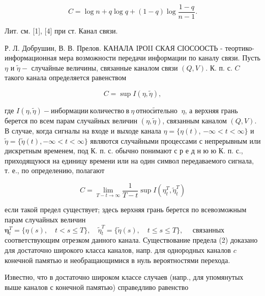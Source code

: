 \documentclass[10pt]{article}
\begin{document}
\[

C=\log n+q \log q+(1-q) \log \frac{1-q}{n-1} .

\]



Лит. см. [1], [4] при ст. Канал связи.



Р. Л. Добрушин, В. В. Прелов. КАНАЛА IРОII СКАЯ СІОСООСТЬ - теортико-информационная мера возможности передачи информации по каналу связи. Пусть $\eta$ и $\tilde{\eta}-$ случайные величины, связанные каналом связи $(Q, V)$. К. п. с. $C$ такого канала определяется равенством



\[

C=\sup I(\eta, \tilde{\eta}),

\]



где $I(\eta, \tilde{\eta})-и н б о р м а ц и и ~ к о л и ч е с т в о ~ в ~ \tilde{\eta ~ о т н о с и т е л ь н о ~}$ $\eta$, а верхняя грань берется по всем парам случайных величин $(\eta, \tilde{\eta})$, связанным каналом $(Q, V)$. В случае, когда сигналы на входе и выходе канала $\eta=\{\eta(t)$, $-\infty<t<\infty\}$ и $\tilde{\eta}=\{\tilde{\eta}(t),-\infty<t<\infty\}$ являются случайными процессами с непрерывным или дискретным временем, под К. п. с. обычно понимают с р е д н ю ю К. п. с., приходящуюся на единицу времени или на один символ передаваемого сигнала, т. е., по определению, полагают



\[

C=\lim _{T-t \rightarrow \infty} \frac{1}{T-t} \sup I\left(\eta_{t}^{T}, \tilde{\eta}_{t}^{T}\right)

\]



если такой предел существует; здесь верхняя грань берется по всевозможным парам случайных величин $\boldsymbol{\eta}_{t}^{T}=\{\eta(s), \quad t<s \leqslant T\}, \quad \tilde{\eta}_{t}^{T}=\{\tilde{\eta}(s), \quad t \leqslant s \leqslant T\}, \quad$ связанных соответствующим отрезком данного канала. Существование предела (2) доказано для достаточно широкого класса каналов, напр. для однородных каналов $c$ конечной памятью и необращающимися в нуль вероятностями перехода.



Известно, что в достаточно широком классе случаев (напр., для упомянутых выше каналов с конечной памятью) справедливо равенство
\end{document}
